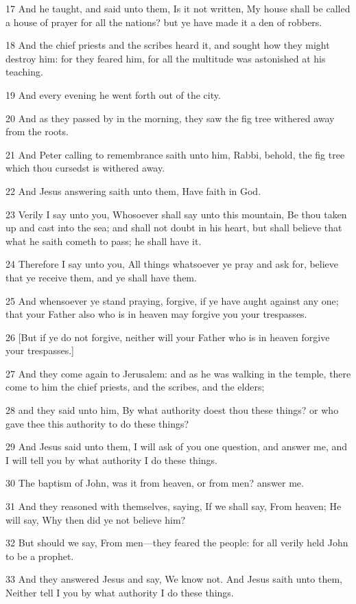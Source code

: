 \par 17 And he taught, and said unto them, Is it not written, My house shall be called a house of prayer for all the nations? but ye have made it a den of robbers.
\par 18 And the chief priests and the scribes heard it, and sought how they might destroy him: for they feared him, for all the multitude was astonished at his teaching.
\par 19 And every evening he went forth out of the city.
\par 20 And as they passed by in the morning, they saw the fig tree withered away from the roots.
\par 21 And Peter calling to remembrance saith unto him, Rabbi, behold, the fig tree which thou cursedst is withered away.
\par 22 And Jesus answering saith unto them, Have faith in God.
\par 23 Verily I say unto you, Whosoever shall say unto this mountain, Be thou taken up and cast into the sea; and shall not doubt in his heart, but shall believe that what he saith cometh to pass; he shall have it.
\par 24 Therefore I say unto you, All things whatsoever ye pray and ask for, believe that ye receive them, and ye shall have them.
\par 25 And whensoever ye stand praying, forgive, if ye have aught against any one; that your Father also who is in heaven may forgive you your trespasses.
\par 26 [But if ye do not forgive, neither will your Father who is in heaven forgive your trespasses.]
\par 27 And they come again to Jerusalem: and as he was walking in the temple, there come to him the chief priests, and the scribes, and the elders;
\par 28 and they said unto him, By what authority doest thou these things? or who gave thee this authority to do these things?
\par 29 And Jesus said unto them, I will ask of you one question, and answer me, and I will tell you by what authority I do these things.
\par 30 The baptism of John, was it from heaven, or from men? answer me.
\par 31 And they reasoned with themselves, saying, If we shall say, From heaven; He will say, Why then did ye not believe him?
\par 32 But should we say, From men—they feared the people: for all verily held John to be a prophet.
\par 33 And they answered Jesus and say, We know not. And Jesus saith unto them, Neither tell I you by what authority I do these things.

